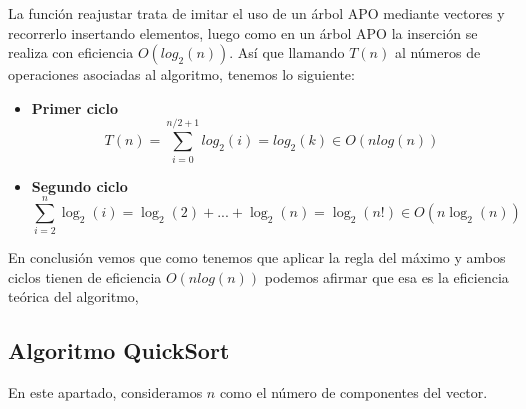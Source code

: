 \documentclass{homework}
\begin{document}
    La función reajustar trata de imitar el uso de un árbol APO mediante vectores y recorrerlo insertando elementos, luego como en un árbol APO la inserción se 
    realiza con eficiencia $O(log_2(n))$. Así que llamando $T(n)$ al números de operaciones asociadas al algoritmo, tenemos lo siguiente:
    
    \begin{itemize}
        \item \textbf{Primer ciclo}
        \begin{equation*}
            T(n) = \sum_{i=0}^{n/2 + 1} log_2(i) = log_2(k) \in O(nlog(n))
        \end{equation*} 

        \item \textbf{Segundo ciclo}
            $$\sum_{i=2}^{n} \log_2(i) = \log_2(2) + ... + \log_2(n) = \log_2(n!) \in O(n \log_2(n))$$
        
        
    \end{itemize}

    En conclusión vemos que como tenemos que aplicar la regla del máximo y ambos ciclos tienen de eficiencia $O(nlog(n))$ podemos afirmar que esa es la eficiencia
    teórica del algoritmo, 

    \subsection{Algoritmo QuickSort}
    
     

    En este apartado, consideramos $n$ como el número de componentes del vector. 
\end{document}
